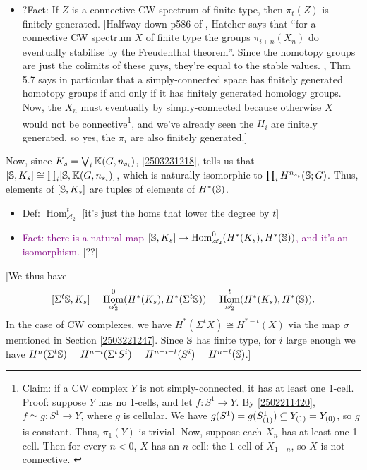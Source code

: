 \documentclass{MetricNotes2023}
\def\bb{\ensuremath\mathbb}
\def\subq{\ensuremath\subseteq}
\def\A{\ensuremath{\mathscr{A}_2}}
\DeclareMathOperator{\Hom}{Hom}
\def\textcolour{\textcolor}
\begin{document}
\begin{itemize}
\item ?Fact: If \(Z\) is a connective CW spectrum of finite type, then \(\pi_t(Z)\) is finitely generated. [Halfway down p586 of \autocite{hatcher5}, Hatcher says that ``for a connective CW spectrum \(X\) of finite type the groups \(\pi_{i+n}(X_n)\) do eventually stabilise by the Freudenthal theorem''. Since the homotopy groups are just the colimits of these guys, they're equal to the stable values. \autocite{hatcher}, Thm 5.7 says in particular that a simply-connected space has finitely generated homotopy groups if and only if it has finitely generated homology groups. Now, the \(X_n\) must eventually by simply-connected because otherwise \(X\) would not be connective\footnote{Claim: if a CW complex \(Y\) is not simply-connected, it has at least one 1-cell. Proof: suppose \(Y\) has no 1-cells, and let \(f : S^1 \to Y\). By \ref{2502211420}, \(f\simeq g : S^1 \to Y\), where \(g\) is cellular. We have \(g(S^1)=g(S^1_{(1)})\subq Y_{(1)}=Y_{(0)}\), so \(g\) is constant. Thus, \(\pi_1(Y)\) is trivial. Now, suppose each \(X_n\) has at least one 1-cell. Then for every \(n <0\), \(X\) has an \(n\)-cell: the \(1\)-cell of \(X_{1-n}\), so \(X\) is not connective. \label{2504071143}}, and we've already seen the \(H_i\) are finitely generated, so yes, the \(\pi_i\) are also finitely generated.]
\end{itemize}

Now, since \(K_s = \bigvee_i \bb{K}(G, n_{s_i})\),  \ref{2503231218}, tells us that \([\bb{S}, K_s]\cong \prod_i[\bb{S}, \bb{K}(G, n_{s_i})]\), which is naturally isomorphic to \(\prod_i H^{n_{s_i}}(\bb{S}; G)\). Thus, elements of \([\bb{S}, K_s]\) are tuples of elements of \(H^*(\bb{S})\).

\begin{itemize}
\item Def: \(\Hom^t_{\A}\) [it's just the homs that lower the degree by \(t\)]

\item \textcolour{purple}{Fact: there is a natural map \([\bb{S}, K_s]\to \Hom^0_{\A}(H^*(K_s), H^*(\bb{S}))\), and it's an isomorphism.} [??]
\end{itemize}

[We thus have
\[[\Sigma^t \bb{S}, K_s]=\Hom^0_{\A}(H^*(K_s), H^*(\Sigma^t \bb{S}))=\Hom^t_{\A}(H^*(K_s), H^*(\bb{S})).\]
In the case of CW complexes, we have \(H^*(\Sigma^t X)\cong H^{*-t}(X)\) via the map \(\sigma\) mentioned in Section  \ref{2503221247}. Since \(\bb{S}\) has finite type, for \(i\) large enough we have \(H^n(\Sigma^t\bb{S})=H^{n+i}(\Sigma^t S^i)=H^{n+i-t}(S^i)=H^{n-t}(\bb{S})\).]
\end{document}
